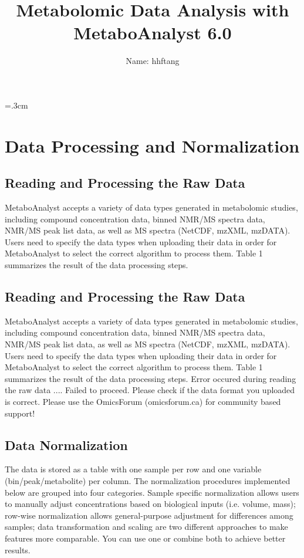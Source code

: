 \documentclass[a4paper]{article}
\title{Metabolomic Data Analysis with MetaboAnalyst 6.0}
\author{ Name: hhftang }
\begin{document}
\parskip=.3cm
\maketitle
\section{Data Processing and Normalization}
\subsection{Reading and Processing the Raw Data}
 MetaboAnalyst accepts a variety of data types generated in metabolomic studies, including compound concentration data, binned NMR/MS spectra data, NMR/MS peak list data, as well as MS spectra (NetCDF, mzXML, mzDATA). Users need to specify the data types when uploading their data in order for MetaboAnalyst to select the correct algorithm to process them.
 Table 1 summarizes the result of the data processing steps.
\subsection{Reading and Processing the Raw Data}
 MetaboAnalyst accepts a variety of data types generated in metabolomic studies, including compound concentration data, binned NMR/MS spectra data, NMR/MS peak list data, as well as MS spectra (NetCDF, mzXML, mzDATA). Users need to specify the data types when uploading their data in order for MetaboAnalyst to select the correct algorithm to process them.
 Table 1 summarizes the result of the data processing steps.
 Error occured during reading the raw data .... Failed to proceed. Please check if the data format you uploaded is correct. Please use the OmicsForum (omicsforum.ca) for community based support!
\subsection{Data Normalization}
 The data is stored as a table with one sample per row and one variable (bin\slash peak\slash metabolite) per column. The normalization procedures implemented below are grouped into four categories. Sample specific normalization allows users to manually adjust concentrations based on biological inputs (i.e. volume, mass); row-wise normalization allows general-purpose adjustment for differences among samples; data transformation and scaling are two different approaches to make features more comparable. You can use one or combine both to achieve better results. 
\end{document}
